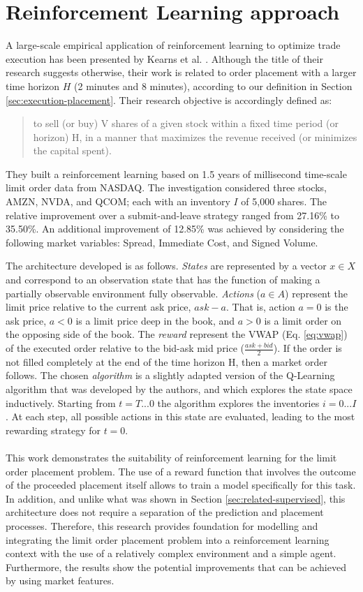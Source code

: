 \section{Reinforcement Learning approach}
\label{sec:related-reinforcement}
A large-scale empirical application of reinforcement learning to optimize trade execution has been presented by Kearns et al. \cite{nevmyvaka2006reinforcement}.
Although the title of their research suggests otherwise, their work is related to order placement with a larger time horizon $H$ (2 minutes and 8 minutes), according to our definition in Section \ref{sec:execution-placement}.
Their research objective is accordingly defined as:
\begin{quote}
    to sell (or buy) V shares of a given stock within a fixed time period (or horizon) H, in a manner that maximizes the revenue received (or minimizes the capital spent).
\end{quote}
They built a reinforcement learning based on 1.5 years of millisecond time-scale limit order data from NASDAQ.
The investigation considered three stocks, AMZN, NVDA, and QCOM; each with an inventory $I$ of 5,000 shares.
The relative improvement over a submit-and-leave strategy ranged from 27.16\% to 35.50\%.
An additional improvement of 12.85\% was achieved by considering the following market variables: Spread, Immediate Cost, and Signed Volume.

The architecture developed is as follows.
\textit{States} are represented by a vector $x \in X$ and correspond to an observation state that has the function of making a  partially observable environment fully observable.
\textit{Actions} ($a \in A$) represent the limit price relative to the current ask price, $ask - a$. 
That is, action $a = 0$ is the ask price, $a < 0$ is a limit price deep in the book, and $a > 0$ is a limit order on the opposing side of the book.
The \textit{reward} represent the VWAP (Eq. \ref{eq:vwap}) of the executed order relative to the bid-ask mid price ($\frac{ask + bid}{2}$).
If the order is not filled completely at the end of the time horizon H, then a market order follows.
The chosen \textit{algorithm} is a slightly adapted version of the Q-Learning algorithm that was developed by the authors, and which explores the state space inductively.
Starting from $t=T...0$ the algorithm explores the inventories $i=0...I$.
At each step, all possible actions in this state are evaluated, leading to the most rewarding strategy for $t=0$.
\\
\\
This work demonstrates the suitability of reinforcement learning for the limit order placement problem.
The use of a reward function that involves the outcome of the proceeded placement itself allows to train a model specifically for this task.
In addition, and unlike what was shown in Section \ref{sec:related-supervised}, this architecture does not require a separation of the prediction and placement processes.
Therefore, this research provides foundation for modelling and integrating the limit order placement problem into a reinforcement learning context with the use of a relatively complex environment and a simple agent.
Furthermore, the results show the potential improvements that can be achieved by using market features.